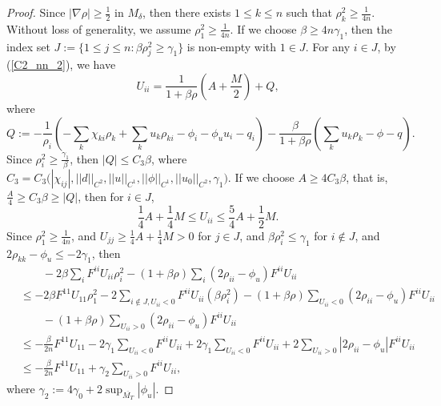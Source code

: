 \documentclass[12pt]{amsart}
\theoremstyle{definition}
\theoremstyle{remark}
\numberwithin{equation}{section}
\begin{document}
\begin{proof}
	
	Since $|\nabla \rho| \geq \frac{1}{2}$ in $M_{\delta}$, 
	then there exists $1 \leq k \leq n$ such that $\rho_{k}^2 \geq \frac{1}{4n}$. Without loss of generality, we assume $\rho_1^2 \geq \frac{1}{4n}.$ If we choose $\beta \geq 4n\gamma_1$, then the index set $J := \{ 1 \leq j \leq n : \beta \rho_j^2 \geq \gamma_1 \}$ is non-empty with $1 \in J$. For any $i\in J$, by (\ref{C2_nn_2}), we have
	\begin{equation}%
	U_{ii} = \frac{1}{1 + \beta \rho} (A + \frac{M}{2}) + Q,
	\end{equation}
	where $$Q  := - \frac{1}{\rho_{i}} \left(-\sum_k \chi_{ki} \rho_k + \sum_k u_{k} \rho_{ki} - \phi_{i} - \phi_{u} u_{i} - q_{i} \right) 
	-  \frac{\beta}{1 + \beta \rho} (\sum_{k} u_{k}\rho_{k} - \phi - q).$$
	Since $\rho_{i}^2 \geq \frac{\gamma_1}{\beta}$, then $|Q| \leq C_3 \beta$, where $C_3 = C_3\big( |\chi_{ij}|, ||d||_{C^2}, || u||_{C^1}, ||\phi||_{C^1}, ||u_0||_{C^2}, \gamma_1  \big)$. 
	If we choose $A \geq 4 C_3 \beta$, that is, $\frac{A}{4} \geq C_3 \beta \geq |Q|$, then for $i\in J$,
	\begin{equation}\label{C2_nn_8}
	\frac{1}{4} A + \frac{1}{4}M \leq U_{ii} \leq \frac{5}{4} A + \frac{1}{2}M.
	\end{equation}
	Since $\rho_1^2 \geq \frac{1}{4n}$, and $U_{jj} \geq \frac{1}{4} A + \frac{1}{4}M > 0$ for $j \in J$, and $\beta\rho_{i}^2 \leq \gamma_1$ for $i \notin J$, and $2\rho_{kk} - \phi_u \leq -2\gamma_1$, then
	\begin{equation}\label{C2_nn_9}
	\begin{aligned}
	&\qquad - 2 \beta \sum_i F^{ii} U_{ii} \rho_i^2 - (1 + \beta\rho) \sum_i ( 2\rho_{ii} - \phi_{u}) F^{ii} U_{ii} \\
	&\leq - 2 \beta F^{11} U_{11} \rho_1^2 - 2 \sum_{i\notin J, U_{ii}<0} F^{ii} U_{ii} (\beta\rho_i^2) - (1 + \beta\rho) \sum_{U_{ii} < 0} ( 2\rho_{ii} - \phi_{u}) F^{ii} U_{ii}\\
	&\qquad - (1 + \beta\rho) \sum_{U_{ii} > 0} ( 2\rho_{ii} - \phi_{u}) F^{ii} U_{ii}\\
	&\leq - \frac{\beta}{2n} F^{11} U_{11} - 2 \gamma_1 \sum_{ U_{ii}<0} F^{ii} U_{ii} + 2 \gamma_1 \sum_{U_{ii} < 0} F^{ii} U_{ii} + 2 \sum_{U_{ii} > 0} | 2\rho_{ii} - \phi_{u}| F^{ii} U_{ii}\\
	&\leq - \frac{\beta}{2n} F^{11} U_{11} + \gamma_2 \sum_{U_{ii} > 0} F^{ii} U_{ii},
	\end{aligned}
	\end{equation}
	where $\gamma_2 := 4\gamma_0 + 2 \sup_{\overline{M_T}} |\phi_u|.$		

\end{proof}
\end{document}
